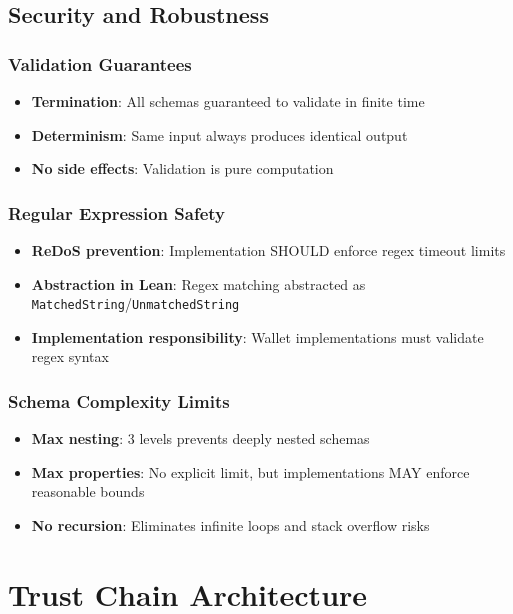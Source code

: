 \section{Security and Robustness}

\subsection{Validation Guarantees}

\begin{itemize}
  \item \textbf{Termination}: All schemas guaranteed to validate in finite time
  \item \textbf{Determinism}: Same input always produces identical output
  \item \textbf{No side effects}: Validation is pure computation
\end{itemize}

\subsection{Regular Expression Safety}

\begin{itemize}
  \item \textbf{ReDoS prevention}: Implementation SHOULD enforce regex timeout limits
  \item \textbf{Abstraction in Lean}: Regex matching abstracted as \texttt{MatchedString}/\texttt{UnmatchedString}
  \item \textbf{Implementation responsibility}: Wallet implementations must validate regex syntax
\end{itemize}

\subsection{Schema Complexity Limits}

\begin{itemize}
  \item \textbf{Max nesting}: 3 levels prevents deeply nested schemas
  \item \textbf{Max properties}: No explicit limit, but implementations MAY enforce reasonable bounds
  \item \textbf{No recursion}: Eliminates infinite loops and stack overflow risks
\end{itemize}

\chapter{Trust Chain Architecture}

